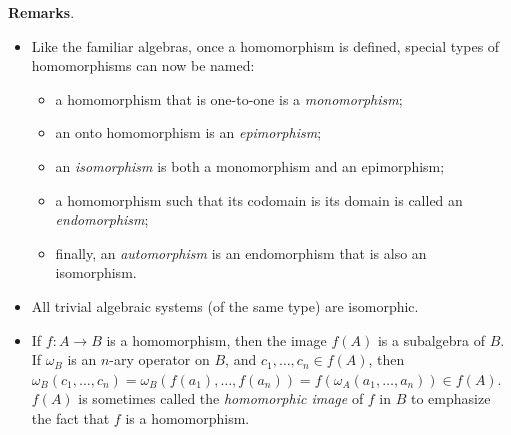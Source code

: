 \documentclass[12pt]{article}
\begin{document}
\textbf{Remarks}.  
\begin{itemize}
\item
Like the familiar algebras, once a homomorphism is defined, special types of homomorphisms can now be named: 
\begin{itemize}
\item a homomorphism that is one-to-one is a \emph{monomorphism}; 
\item an onto homomorphism is an \emph{epimorphism}; 
\item an \emph{isomorphism} is both a monomorphism and an epimorphism; 
\item a homomorphism such that its codomain is its domain is called an \emph{endomorphism}; 
\item finally, an \emph{automorphism} is an endomorphism that is also an isomorphism.
\end{itemize}
\item All trivial algebraic systems (of the same type) are isomorphic.
\item
If $f:A\to B$ is a homomorphism, then the image $f(A)$ is a subalgebra of $B$.  If $\omega_B$ is an $n$-ary operator on $B$, and $c_1,\ldots,c_n\in f(A)$, then $\omega_B(c_1,\ldots,c_n)=\omega_B(f(a_1),\ldots,f(a_n))=f(\omega_A(a_1,\ldots, a_n))\in f(A)$.  $f(A)$ is sometimes called the \emph{homomorphic image} of $f$ in $B$ to emphasize the fact that $f$ is a homomorphism.
\end{itemize}
\end{document}
